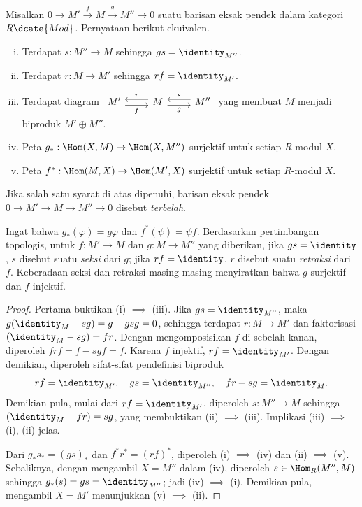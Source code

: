 \begin{proposition}\label{prop:split-ses-mod}
	Misalkan $0 \to M' \xrightarrow{f} M \xrightarrow{g} M'' \to 0$ suatu barisan eksak pendek dalam kategori $R\dcate{Mod}$. Pernyataan berikut ekuivalen.
	\begin{enumerate}[(i)]
		\item Terdapat $s: M'' \to M$ sehingga $gs = \identity_{M''}$.
		\item Terdapat $r: M \to M'$ sehingga $rf = \identity_{M'}$.
		\item Terdapat diagram $\begin{tikzcd} M' \arrow[yshift=-0.7ex, r, "f"'] & M \arrow[yshift=0.7ex, l, "r"'] \arrow[yshift=-0.7ex, r, "g"'] & M'' \arrow[yshift=0.7ex, l, "s"'] \end{tikzcd}$ yang membuat $M$ menjadi biproduk $M' \oplus M''$.
		\item Peta $g_*: \Hom(X, M) \to \Hom(X, M'')$ surjektif untuk setiap $R$-modul $X$.
		\item Peta $f^*: \Hom(M, X) \to \Hom(M', X)$ surjektif untuk setiap $R$-modul $X$.
	\end{enumerate}
	Jika salah satu syarat di atas dipenuhi, barisan eksak pendek $0 \to M' \to M \to M'' \to 0$ disebut \emph{terbelah}.
\end{proposition}
Ingat bahwa $g_*(\varphi) = g\varphi$ dan $f^*(\psi) = \psi f$. Berdasarkan pertimbangan topologis, untuk $f: M' \to M$ dan $g: M \to M''$ yang diberikan, jika $gs = \identity$, $s$ disebut suatu \emph{seksi} dari $g$; jika $rf = \identity$, $r$ disebut suatu \emph{retraksi} dari $f$. Keberadaan seksi dan retraksi masing-masing menyiratkan bahwa $g$ surjektif dan $f$ injektif.
\begin{proof}
	Pertama buktikan (i) $\implies$ (iii). Jika $gs = \identity_{M''}$, maka $g( \identity_M - sg) = g - gsg = 0$, sehingga terdapat $r: M \to M'$ dan faktorisasi $(\identity_M - sg) = fr $. Dengan mengomposisikan $f$ di sebelah kanan, diperoleh $frf = f-sgf = f$. Karena $f$ injektif, $rf=\identity_{M'}$. Dengan demikian, diperoleh sifat-sifat pendefinisi biproduk
	\[ rf = \identity_{M'}, \quad gs = \identity_{M''}, \quad fr + sg  = \identity_M. \]
	Demikian pula, mulai dari $rf = \identity_{M'}$, diperoleh $s: M'' \to M$ sehingga $(\identity_M - fr) = sg$, yang membuktikan (ii) $\implies$ (iii). Implikasi (iii) $\implies$ (i), (ii) jelas.
	
	Dari $g_* s_* = (gs)_*$ dan $f^* r^* = (rf)^*$, diperoleh (i) $\implies$ (iv) dan (ii) $\implies$ (v). Sebaliknya, dengan mengambil $X = M''$ dalam (iv), diperoleh $s \in \Hom_R(M'', M)$ sehingga $g_*(s) = gs = \identity_{M''}$; jadi (iv) $\implies$ (i). Demikian pula, mengambil $X = M'$ menunjukkan (v) $\implies$ (ii).
\end{proof}

